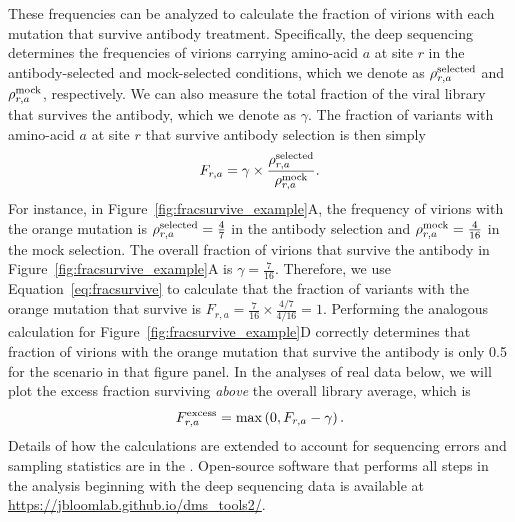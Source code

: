 \documentclass[11pt]{article}
\begin{document}
These frequencies can be analyzed to calculate the fraction of virions with each mutation that survive antibody treatment.
Specifically, the deep sequencing determines the frequencies of virions carrying amino-acid $a$ at site $r$ in the antibody-selected and mock-selected conditions, which we denote as $\rho_{r,a}^{\rm{selected}}$ and $\rho_{r,a}^{\rm{mock}}$, respectively.
We can also measure the total fraction of the viral library that survives the antibody, which we denote as $\gamma$.
The fraction of variants with amino-acid $a$ at site $r$ that survive antibody selection is then simply 
\begin{equation}
\label{eq:fracsurvive}
F_{r,a} = \gamma \times \frac{\rho_{r,a}^{\rm{selected}}}{\rho_{r,a}^{\rm{mock}}}.
\end{equation}
For instance, in Figure~\ref{fig:fracsurvive_example}A, the frequency of virions with the orange mutation is $\rho_{r,a}^{\rm{selected}} = \frac{4}{7}$ in the antibody selection and $\rho_{r,a}^{\rm{mock}} = \frac{4}{16}$ in the mock selection.
The overall fraction of virions that survive the antibody in Figure~\ref{fig:fracsurvive_example}A is $\gamma = \frac{7}{16}$.
Therefore, we use Equation~\ref{eq:fracsurvive} to calculate that the fraction of variants with the orange mutation that survive is $F_{r,a} = \frac{7}{16} \times \frac{4/7}{4/16} = 1$.
Performing the analogous calculation for Figure~\ref{fig:fracsurvive_example}D correctly determines that fraction of virions with the orange mutation that survive the antibody is only 0.5 for the scenario in that figure panel.
In the analyses of real data below, we will plot the excess fraction surviving \emph{above} the overall library average, which is
\begin{equation}
\label{eq:fracsurvive_excess}
F_{r,a}^{\rm{excess}} = \max\left(0, F_{r,a} - \gamma\right).
\end{equation}
Details of how the calculations are extended to account for sequencing errors and sampling statistics are in the .
Open-source software that performs all steps in the analysis beginning with the deep sequencing data is available at \url{https://jbloomlab.github.io/dms_tools2/}.
\end{document}
